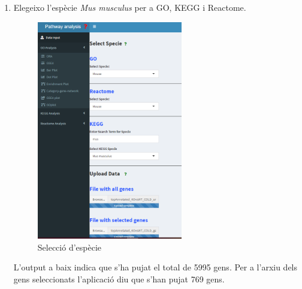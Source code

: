 \begin{enumerate}

\item Elegeixo l'espècie \textit{Mus musculus} per a \gls{GO}, \gls{KEGG} i Reactome.
\begin{figure}[H]
\centering
\includegraphics[width=0.6\textwidth]{figures/Estudi1_Fig1_Select_Specie.png} 
\caption{Selecció d'espècie}
\end{figure}

L'output a baix indica que s'ha pujat el total de 5995 gens. Per a l'arxiu dels gens seleccionats l'aplicació diu que s'han pujat 769 gens.


\end{enumerate}
